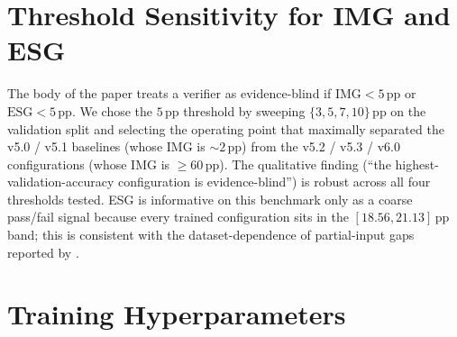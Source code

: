 \documentclass{article}
\begin{document}

\printAffiliationsAndNotice{}



\appendix
\onecolumn

\section{Threshold Sensitivity for IMG and ESG}
\label{app:thresholds}

The body of the paper treats a verifier as evidence-blind if
$\mathrm{IMG} < 5$\,pp or $\mathrm{ESG} < 5$\,pp. We chose the $5$\,pp
threshold by sweeping $\{3, 5, 7, 10\}$\,pp on the validation split and
selecting the operating point that maximally separated the v5.0 / v5.1
baselines (whose IMG is $\sim 2$\,pp) from the v5.2 / v5.3 / v6.0
configurations (whose IMG is $\geq 60$\,pp). The qualitative finding
(``the highest-validation-accuracy configuration is evidence-blind'') is
robust across all four thresholds tested. ESG is informative on this
benchmark only as a coarse pass/fail signal because every trained
configuration sits in the $[18.56, 21.13]$\,pp band; this is consistent
with the dataset-dependence of partial-input gaps reported by
\citet{poliak2018hypothesis}.

\section{Training Hyperparameters}
\label{app:training}
\end{document}
